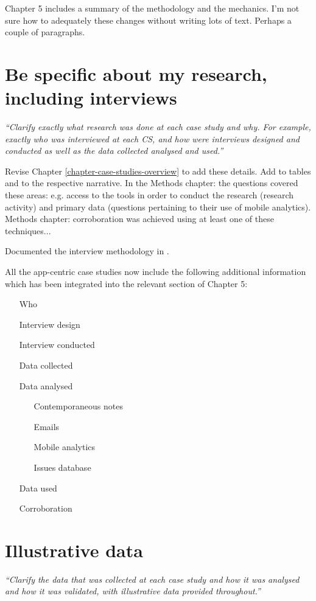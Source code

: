 Chapter 5 includes a summary of the methodology and the mechanics. I'm not sure how to adequately these changes without writing lots of text. Perhaps a couple of paragraphs.

\section{Be specific about my research, including interviews}
\emph{``Clarify exactly what research was done at each case study and why. For example, exactly who was interviewed at each CS, and how were interviews designed and conducted as well as the data collected analysed and used.''}

Revise Chapter \ref{chapter-case-studies-overview} to add these details. Add to tables and to the respective narrative. In the Methods chapter: the questions covered these areas: e.g. access to the tools in order to conduct the research (research activity) and primary data (questions pertaining to their use  of mobile analytics). Methods chapter: corroboration was achieved using at least one of these techniques...

Documented the interview methodology in . 



All the app-centric case studies now include the following additional information which has been integrated into the relevant section of Chapter 5:

\begin{itemize}
    \item[Who]
    \item[Interview design]
    \item[Interview conducted]
    \item[Data collected]
    \item[Data analysed]
    \begin{itemize}
        \item[Contemporaneous notes] 
        \item[Emails]
        \item[Mobile analytics]
        \item[Issues database]
    \end{itemize}
    \item[Data used]
    \item[Corroboration]
\end{itemize}


\section{Illustrative data}
\emph{``Clarify the data that was collected at each case study and how it was analysed and how it was validated, with illustrative data provided throughout.''}


